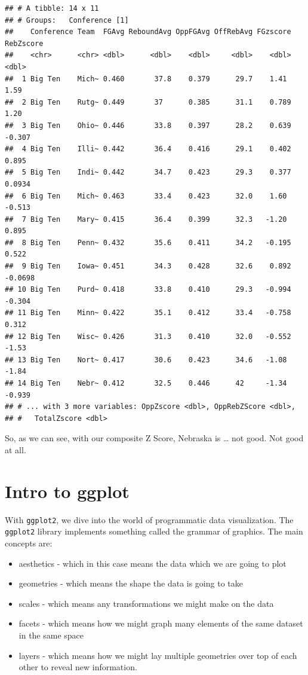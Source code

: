 \documentclass[]{book}
\providecommand{\tightlist}{%
  \setlength{\itemsep}{0pt}\setlength{\parskip}{0pt}}
\begin{document}
\begin{verbatim}
## # A tibble: 14 x 11
## # Groups:   Conference [1]
##    Conference Team  FGAvg ReboundAvg OppFGAvg OffRebAvg FGzscore RebZscore
##    <chr>      <chr> <dbl>      <dbl>    <dbl>     <dbl>    <dbl>     <dbl>
##  1 Big Ten    Mich~ 0.460       37.8    0.379      29.7    1.41     1.59  
##  2 Big Ten    Rutg~ 0.449       37      0.385      31.1    0.789    1.20  
##  3 Big Ten    Ohio~ 0.446       33.8    0.397      28.2    0.639   -0.307 
##  4 Big Ten    Illi~ 0.442       36.4    0.416      29.1    0.402    0.895 
##  5 Big Ten    Indi~ 0.442       34.7    0.423      29.3    0.377    0.0934
##  6 Big Ten    Mich~ 0.463       33.4    0.423      32.0    1.60    -0.513 
##  7 Big Ten    Mary~ 0.415       36.4    0.399      32.3   -1.20     0.895 
##  8 Big Ten    Penn~ 0.432       35.6    0.411      34.2   -0.195    0.522 
##  9 Big Ten    Iowa~ 0.451       34.3    0.428      32.6    0.892   -0.0698
## 10 Big Ten    Purd~ 0.418       33.8    0.410      29.3   -0.994   -0.304 
## 11 Big Ten    Minn~ 0.422       35.1    0.412      33.4   -0.758    0.312 
## 12 Big Ten    Wisc~ 0.426       31.3    0.410      32.0   -0.552   -1.53  
## 13 Big Ten    Nort~ 0.417       30.6    0.423      34.6   -1.08    -1.84  
## 14 Big Ten    Nebr~ 0.412       32.5    0.446      42     -1.34    -0.939 
## # ... with 3 more variables: OppZscore <dbl>, OppRebZScore <dbl>,
## #   TotalZscore <dbl>
\end{verbatim}

So, as we can see, with our composite Z Score, Nebraska is \ldots{} not good. Not good at all.

\hypertarget{intro-to-ggplot}{%
\chapter{Intro to ggplot}\label{intro-to-ggplot}}

With \texttt{ggplot2}, we dive into the world of programmatic data visualization. The \texttt{ggplot2} library implements something called the grammar of graphics. The main concepts are:

\begin{itemize}
\tightlist
\item
  aesthetics - which in this case means the data which we are going to plot
\item
  geometries - which means the shape the data is going to take
\item
  scales - which means any transformations we might make on the data
\item
  facets - which means how we might graph many elements of the same dataset in the same space
\item
  layers - which means how we might lay multiple geometries over top of each other to reveal new information.
\end{itemize}
\end{document}
